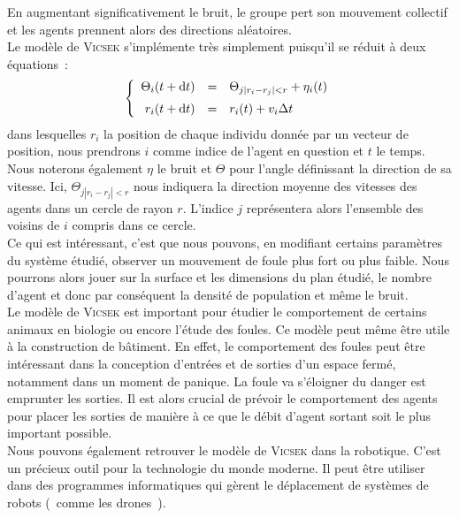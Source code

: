 \documentclass[french, a4paper, 12pt, openany]{report}
\begin{document}
	En augmentant significativement le bruit, le groupe pert son mouvement collectif et les agents prennent alors des directions aléatoires.\\

	Le modèle de \textsc{Vicsek} s'implémente très simplement puisqu'il se réduit à deux équations~: \label{equations} 
	\[ \left\{ \begin{array}{rcl}
		\Theta_{i}(t + \text dt) & = & \Theta_{j |r_{i}-r_{j}|<r} + \eta_{i}(t) \\[0.2cm]
		r_{i}(t + \text dt) & = & r_{i}(t) + v_{i}\Delta t
	\end{array} \right. \]
	dans lesquelles $r_{i}$ la position de chaque individu donnée par un vecteur de position, nous prendrons $i$ comme indice de l'agent en question et $t$ le temps. Nous noterons également $\eta$ le bruit et $\Theta$ pour l’angle définissant la direction de sa vitesse. Ici, $\Theta_{j |r_{i}-r_{j}|<r}$ nous indiquera la direction moyenne des vitesses des agents dans un cercle de rayon $r$. L'indice $j$ représentera alors l'ensemble des voisins de $i$ compris dans ce cercle.\\

	Ce qui est intéressant, c'est que nous pouvons, en modifiant certains paramètres du système étudié, observer un mouvement de foule plus fort ou plus faible. Nous pourrons alors jouer sur la surface et les dimensions du plan étudié, le nombre d'agent et donc par conséquent la densité de population et même le bruit.\\

	Le modèle de \textsc{Vicsek} est important pour étudier le comportement de certains animaux en biologie ou encore l'étude des foules. Ce modèle peut même être utile à la construction de bâtiment. En effet, le comportement des foules peut être intéressant dans la conception d'entrées et de sorties d'un espace fermé, notamment dans un moment de panique. La foule va s'éloigner du danger est emprunter les sorties. Il est alors crucial de prévoir le comportement des agents pour placer les sorties de manière à ce que le débit d'agent sortant soit le plus important possible.\\
	
	Nous pouvons également retrouver le modèle de \textsc{Vicsek} dans la robotique. C'est un précieux outil pour la technologie du monde moderne. Il peut être utiliser dans des programmes informatiques qui gèrent le déplacement de systèmes de robots (~comme les drones~).\\ 
\end{document}
